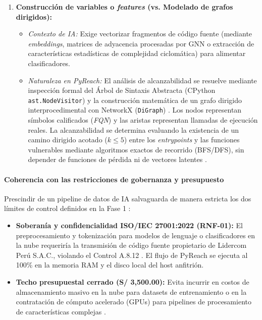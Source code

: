 \begin{enumerate}
    \item \textbf{Construcción de variables o \textit{features} (vs. Modelado de grafos dirigidos):}
    \begin{itemize}
        \item \textit{Contexto de IA:} Exige vectorizar fragmentos de código fuente (mediante \textit{embeddings}, matrices de adyacencia procesadas por GNN o extracción de características estadísticas de complejidad ciclomática) para alimentar clasificadores.
        \item \textit{Naturaleza en PyReach:} El análisis de alcanzabilidad se resuelve mediante inspección formal del Árbol de Sintaxis Abstracta (CPython \texttt{ast.\allowbreak NodeVisitor}) y la construcción matemática de un grafo dirigido interprocedimental con NetworkX (\texttt{DiGraph}) \cite{salis2021pycg, hagberg2008exploring}. Los nodos representan símbolos calificados (\textit{FQN}) y las aristas representan llamadas de ejecución reales. La alcanzabilidad se determina evaluando la existencia de un camino dirigido acotado ($k \le 5$) entre los \textit{entrypoints} y las funciones vulnerables mediante algoritmos exactos de recorrido (BFS/DFS), sin depender de funciones de pérdida ni de vectores latentes \cite{ryder1979constructing, pashchenko2022vuln4real}.
    \end{itemize}
\end{enumerate}

\paragraph*{Coherencia con las restricciones de gobernanza y presupuesto}
Prescindir de un pipeline de datos de IA salvaguarda de manera estricta los dos límites de control definidos en la Fase 1 \cite{torres2026proyecto}:
\begin{itemize}
    \item \textbf{Soberanía y confidencialidad ISO/IEC 27001:2022 (RNF-01):} El preprocesamiento y tokenización para modelos de lenguaje o clasificadores en la nube requeriría la transmisión de código fuente propietario de Lidercom Perú S.A.C., violando el Control A.8.12 \cite{ladisa2023sok, gutierrez2024auditoria}. El flujo de PyReach se ejecuta al 100\% en la memoria RAM y el disco local del host anfitrión.
    \item \textbf{Techo presupuestal cerrado (S/ 3,500.00):} Evita incurrir en costos de almacenamiento masivo en la nube para datasets de entrenamiento o en la contratación de cómputo acelerado (GPUs) para pipelines de procesamiento de características complejas \cite{torres2026proyecto}.
\end{itemize}

